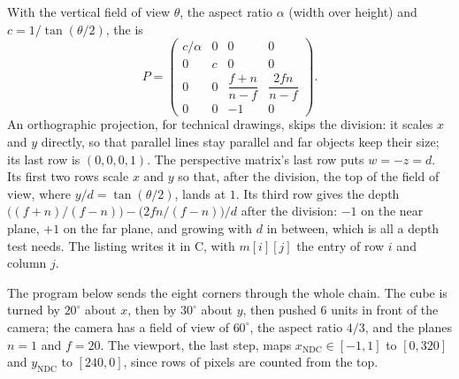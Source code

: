 With the vertical field of view $\theta$, the aspect ratio $\alpha$ (width over height) and $c = 1/\tan(\theta/2)$, the  is
\[
P = \begin{pmatrix} c/\alpha & 0 & 0 & 0 \\ 0 & c & 0 & 0 \\ 0 & 0 & \dfrac{f + n}{n - f} & \dfrac{2fn}{n - f} \\ 0 & 0 & -1 & 0 \end{pmatrix}.
\]
An orthographic projection, for technical drawings, skips the division: it scales $x$ and $y$ directly, so that parallel lines stay parallel and far objects keep their size; its last row is $(0, 0, 0, 1)$. The perspective matrix's last row puts $w = -z = d$. Its first two rows scale $x$ and $y$ so that, after the division, the top of the field of view, where $y/d = \tan(\theta/2)$, lands at $1$. Its third row gives the depth $\bigl((f+n)/(f-n)\bigr) - \bigl(2fn/(f-n)\bigr)/d$ after the division: $-1$ on the near plane, $+1$ on the far plane, and growing with $d$ in between, which is all a depth test needs. The listing writes it in C, with $m[i][j]$ the entry of row $i$ and column $j$.

\label{lst:b3:computer-graphics:perspective}

The program below sends the eight corners through the whole chain. The cube is turned by $20^\circ$ about $x$, then by $30^\circ$ about $y$, then pushed 6 units in front of the camera; the camera has a field of view of $60^\circ$, the aspect ratio $4/3$, and the planes $n = 1$ and $f = 20$. The viewport, the last step, maps $x_{\mathrm{NDC}} \in [-1, 1]$ to $[0, 320]$ and $y_{\mathrm{NDC}}$ to $[240, 0]$, since rows of pixels are counted from the top.

\label{lst:b3:computer-graphics:transform}

\label{out:b3:computer-graphics:transform}

